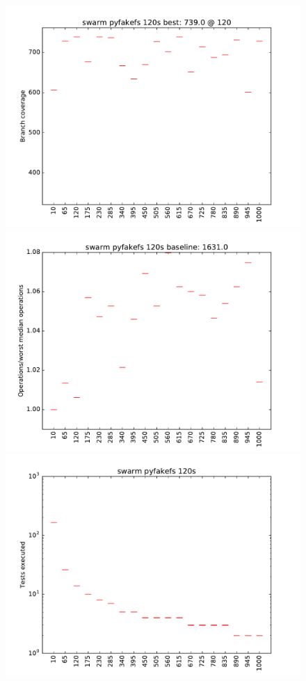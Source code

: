 \begin{figure}
\includegraphics[width=\columnwidth]{graphs/pyfakefsswarm120}
\includegraphics[width=\columnwidth]{graphs/opspyfakefsswarm120}
\includegraphics[width=\columnwidth]{graphs/execpyfakefsswarm120}
\end{figure}


